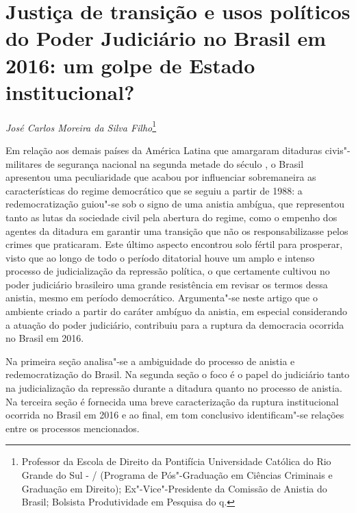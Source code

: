 \chapter*{Justiça de transição e usos políticos do Poder Judiciário
no Brasil em 2016: um golpe de Estado institucional?}


\begin{flushright}
\emph{José Carlos Moreira da Silva Filho}\footnote{Professor da Escola
  de Direito da Pontifícia Universidade Católica do Rio Grande do Sul -
  / (Programa de Pós"-Graduação em Ciências Criminais e Graduação em
  Direito); Ex"-Vice"-Presidente da Comissão de Anistia do Brasil;
  Bolsista Produtividade em Pesquisa do q.}
\end{flushright}

Em relação aos demais países da América Latina que amargaram ditaduras
civis"-militares de segurança nacional na segunda metade do século , o
Brasil apresentou uma peculiaridade que acabou por influenciar
sobremaneira as características do regime democrático que se seguiu a
partir de 1988: a redemocratização guiou"-se sob o signo de uma anistia
ambígua, que representou tanto as lutas da sociedade civil pela abertura
do regime, como o empenho dos agentes da ditadura em garantir uma
transição que não os responsabilizasse pelos crimes que praticaram. Este
último aspecto encontrou solo fértil para prosperar, visto que ao longo
de todo o período ditatorial houve um amplo e intenso processo de
judicialização da repressão política, o que certamente cultivou no poder
judiciário brasileiro uma grande resistência em revisar os termos dessa
anistia, mesmo em período democrático. Argumenta"-se neste artigo que o
ambiente criado a partir do caráter ambíguo da anistia, em especial
considerando a atuação do poder judiciário, contribuiu para a ruptura da
democracia ocorrida no Brasil em 2016.

Na primeira seção analisa"-se a ambiguidade do processo de anistia e
redemocratização do Brasil. Na segunda seção o foco é o papel do
judiciário tanto na judicialização da repressão durante a ditadura
quanto no processo de anistia. Na terceira seção é fornecida uma breve
caracterização da ruptura institucional ocorrida no Brasil em 2016 e ao
final, em tom conclusivo identificam"-se relações entre os processos
mencionados.

